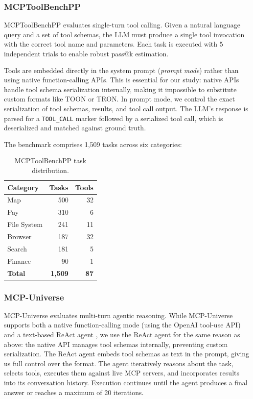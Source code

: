 \documentclass[10pt,twocolumn,letterpaper]{article}
\begin{document}
\subsubsection{MCPToolBenchPP}
MCPToolBenchPP \citep{fan2025mcptoolbench} evaluates single-turn tool calling. Given a natural language query and a set of tool schemas, the LLM must produce a single tool invocation with the correct tool name and parameters. Each task is executed with 5 independent trials to enable robust pass@k estimation.

Tools are embedded directly in the system prompt (\textit{prompt mode}) rather than using native function-calling APIs. This is essential for our study: native APIs handle tool schema serialization internally, making it impossible to substitute custom formats like TOON or TRON. In prompt mode, we control the exact serialization of tool schemas, results, and tool call output. The LLM's response is parsed for a \texttt{TOOL\_CALL} marker followed by a serialized tool call, which is deserialized and matched against ground truth.

The benchmark comprises 1,509 tasks across six categories:

\begin{table}[h]
    \centering
    \footnotesize
    \caption{MCPToolBenchPP task distribution.}
    \label{tab:benchpp_tasks}
    \begin{tabular}{@{}lrr@{}}
        \toprule
        \textbf{Category} & \textbf{Tasks} & \textbf{Tools} \\
        \midrule
        Map              & 500 & 32 \\
        Pay              & 310 & 6 \\
        File System      & 241 & 11 \\
        Browser          & 187 & 32 \\
        Search           & 181 & 5 \\
        Finance          & 90  & 1 \\
        \midrule
        \textbf{Total}   & \textbf{1,509} & \textbf{87} \\
        \bottomrule
    \end{tabular}
\end{table}

\subsubsection{MCP-Universe}
MCP-Universe \citep{luo2025mcpuniverse} evaluates multi-turn agentic reasoning. While MCP-Universe supports both a native function-calling mode (using the OpenAI tool-use API) and a text-based ReAct agent \citep{yao2023react}, we use the ReAct agent for the same reason as above: the native API manages tool schemas internally, preventing custom serialization. The ReAct agent embeds tool schemas as text in the prompt, giving us full control over the format. The agent iteratively reasons about the task, selects tools, executes them against live MCP servers, and incorporates results into its conversation history. Execution continues until the agent produces a final answer or reaches a maximum of 20 iterations.
\end{document}
